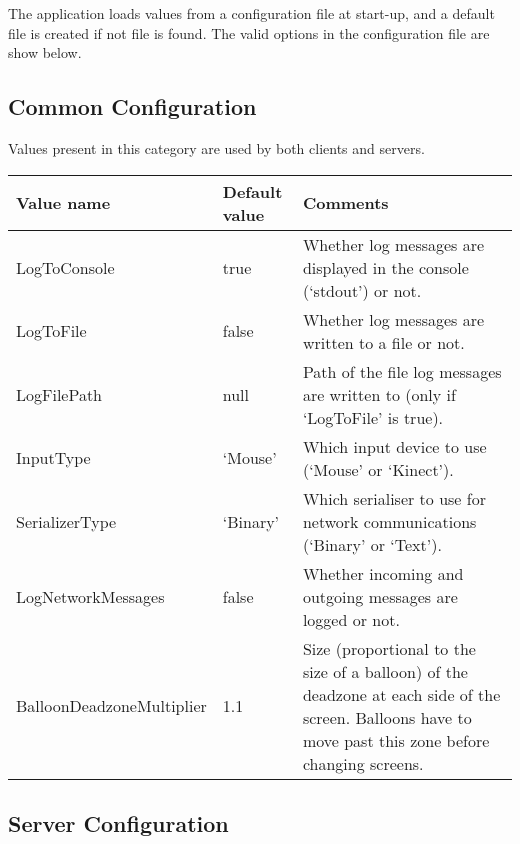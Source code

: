 The application loads values from a configuration file at start-up, and a default file is created if not file is found.
The valid options in the configuration file are show below.

\subsection{Common Configuration}

Values present in this category are used by both clients and servers.

\begin{tabular}{|p{5.2cm}|p{2.8cm}|p{7.6cm}|}

\hline Value name & Default value & Comments \\ \hline

LogToConsole & true & Whether log messages are displayed in the console (`stdout') or not.  \\ \hline

LogToFile & false & Whether log messages are written to a file or not. \\ \hline

LogFilePath & null & Path of the file log messages are written to (only if `LogToFile' is true). \\ \hline

InputType & `Mouse' & Which input device to use (`Mouse' or `Kinect'). \\ \hline

SerializerType & `Binary' & Which serialiser to use for network communications (`Binary' or `Text'). \\ \hline

LogNetworkMessages & false & Whether incoming and outgoing messages are logged or not. \\ \hline

BalloonDeadzoneMultiplier & 1.1 & Size (proportional to the size of a balloon) of the deadzone at each side of the screen. Balloons have to move past this zone before changing screens. \\ \hline

\end{tabular}

\clearpage{}

\subsection{Server Configuration}

